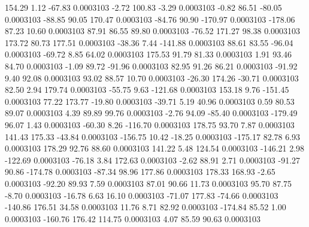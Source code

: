       154.29        1.12      -67.83     0.0003103
       -2.72      100.83       -3.29     0.0003103
       -0.82       86.51      -80.05     0.0003103
      -88.85       90.05      170.47     0.0003103
      -84.76       90.90     -170.97     0.0003103
     -178.06       87.23       10.60     0.0003103
       87.91       86.55       89.80     0.0003103
      -76.52      171.27       98.38     0.0003103
      173.72       80.73      177.51     0.0003103
      -38.36        7.44     -141.88     0.0003103
       88.61       83.55      -96.04     0.0003103
      -69.72        8.85       64.02     0.0003103
      175.53       91.79       81.33     0.0003103
        1.91       93.46       84.70     0.0003103
       -1.09       89.72      -91.96     0.0003103
       82.95       91.26       86.21     0.0003103
      -91.92        9.40       92.08     0.0003103
       93.02       88.57       10.70     0.0003103
      -26.30      174.26      -30.71     0.0003103
       82.50        2.94      179.74     0.0003103
      -55.75        9.63     -121.68     0.0003103
      153.18        9.76     -151.45     0.0003103
       77.22      173.77      -19.80     0.0003103
      -39.71        5.19       40.96     0.0003103
        0.59       80.53       89.07     0.0003103
        4.39       89.89       99.76     0.0003103
       -2.76       94.09      -85.40     0.0003103
     -179.49       96.07        1.43     0.0003103
      -60.30        8.26     -116.70     0.0003103
      178.75       93.70        7.87     0.0003103
      141.43      175.33      -43.84     0.0003103
     -156.75       10.42      -18.25     0.0003103
     -175.17       82.78        6.93     0.0003103
      178.29       92.76       88.60     0.0003103
      141.22        5.48      124.54     0.0003103
     -146.21        2.98     -122.69     0.0003103
      -76.18        3.84      172.63     0.0003103
       -2.62       88.91        2.71     0.0003103
      -91.27       90.86     -174.78     0.0003103
      -87.34       98.96      177.86     0.0003103
      178.33      168.93       -2.65     0.0003103
      -92.20       89.93        7.59     0.0003103
       87.01       90.66       11.73     0.0003103
       95.70       87.75       -8.70     0.0003103
      -16.78        6.63       16.10     0.0003103
      -71.07      177.83      -74.66     0.0003103
     -140.86      176.51       34.58     0.0003103
       11.76        8.71       82.92     0.0003103
     -174.84       85.52        1.00     0.0003103
     -160.76      176.42      114.75     0.0003103
        4.07       85.59       90.63     0.0003103
